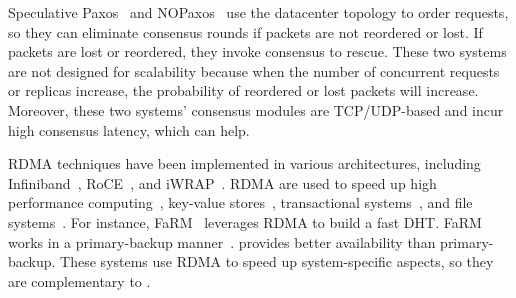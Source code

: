 
Speculative Paxos~\cite{specpaxos:nsdi15} and NOPaxos~\cite{nopaxos:osdi16} 
use the datacenter topology to order requests, so 
they can eliminate consensus rounds if packets are not reordered or lost. If 
packets are lost or reordered, they invoke consensus to rescue.
These two systems are not designed for scalability because when the 
number of concurrent requests or replicas increase, the probability of 
reordered or lost packets will increase. Moreover, these two systems' consensus 
modules are TCP/UDP-based and incur high consensus latency, which 
\xxx can help.

 RDMA techniques have been implemented in various 
architectures, including Infiniband~\cite{infiniband}, RoCE~\cite{roce}, and 
iWRAP~\cite{iwrap}. RDMA are used to speed up high performance 
computing~\cite{openmpi}, key-value 
stores~\cite{pilaf:usenix14,herd:sigcomm14,farm:nsdi14,memcached:rdma}, 
transactional systems~\cite{drtm:sosp15,farm:sosp15,fasst:osdi16}, 
and file 
systems~\cite{gibson:nfs}. For instance, FaRM~\cite{farm:nsdi14} leverages RDMA 
to build a fast DHT. FaRM works in a primary-backup 
manner~\cite{remus:nsdi08,ramcloud:sosp11}. \paxos provides better availability 
than primary-backup. These systems use RDMA to speed up system-specific aspects, 
so they are complementary to \xxx.





